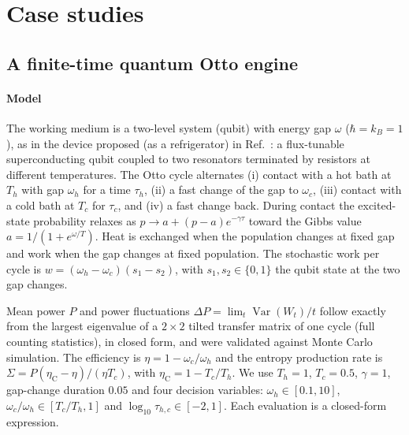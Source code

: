 \documentclass[journal]{IEEEtran}
\theoremstyle{remark}
\newcommand{\etaC}{\eta_{\mathrm{C}}}
\begin{document}
\section{Case studies}
\label{sec:case}

\subsection{A finite-time quantum Otto engine}
\label{sec:otto}

\paragraph*{Model}
The working medium is a two-level system (qubit) with energy gap $\omega$ ($\hbar = k_B = 1$),
as in the device proposed (as a refrigerator) in Ref.~\cite{Karimi2016}: a flux-tunable
superconducting qubit coupled to two resonators terminated by resistors at different temperatures. The Otto cycle alternates (i) contact with a hot bath at
$T_h$ with gap $\omega_h$ for a time $\tau_h$, (ii) a fast change of the gap to $\omega_c$, (iii)
contact with a cold bath at $T_c$ for $\tau_c$, and (iv) a fast change back. During contact the
excited-state probability relaxes as $p \to a + (p-a)e^{-\gamma\tau}$ toward the Gibbs value
$a = 1/(1+e^{\omega/T})$. Heat is exchanged when the population changes at fixed gap and work when
the gap changes at fixed population. The stochastic work per cycle is
$w = (\omega_h - \omega_c)(s_1 - s_2)$, with $s_1, s_2 \in \{0,1\}$ the qubit state at the two gap
changes.

Mean power $P$ and power fluctuations $\Delta P = \lim_t \operatorname{Var}(W_t)/t$ follow exactly
from the largest eigenvalue of a $2\times2$ tilted transfer matrix of one cycle (full counting
statistics), in closed form, and were validated against Monte Carlo simulation. The efficiency is
$\eta = 1 - \omega_c/\omega_h$ and the entropy production rate is
$\Sigma = P(\etaC - \eta)/(\eta T_c)$, with $\etaC = 1 - T_c/T_h$. We use $T_h = 1$, $T_c = 0.5$,
$\gamma = 1$, gap-change duration $0.05$ and four decision variables:
$\omega_h \in [0.1,10]$, $\omega_c/\omega_h \in [T_c/T_h, 1]$ and
$\log_{10}\tau_{h,c} \in [-2,1]$. Each evaluation is a closed-form expression.
\end{document}
